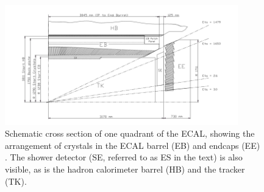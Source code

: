 \begin{figure}[h]
\centering
\includegraphics[width=0.9\textwidth]{detectorFigures/ecalEBEE.png}
\caption{Schematic cross section of one quadrant of the ECAL, showing the arrangement of crystals in the ECAL barrel (EB) and endcaps (EE) \cite{CMSEcalTDR}. The shower detector (SE, referred to as ES in the text) is also visible, as is the hadron calorimeter barrel (HB) and the tracker (TK).}
\label{fig:ecal}
\end{figure}








